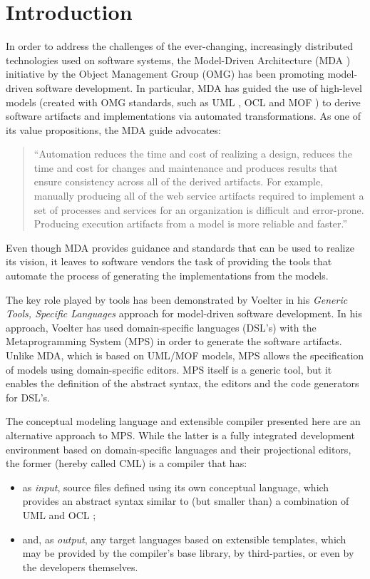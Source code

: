 \section{Introduction}
%
In order to address the challenges of the ever-changing, increasingly distributed technologies used on software systems, the Model-Driven Architecture (MDA \cite{mda}) initiative by the Object Management Group (OMG) has been promoting model-driven software development.
In particular, MDA has guided the use of high-level models (created with OMG standards, such as UML \cite{uml}, OCL \cite{ocl} and MOF \cite{mof}) to derive software artifacts and implementations via automated transformations.
As one of its value propositions, the MDA guide \cite{mda} advocates:
\begin{quote}``Automation reduces the time and cost of realizing a design, reduces the time and cost for changes and maintenance and produces results that ensure consistency across all of the derived artifacts. For example, manually producing all of the web service artifacts required to implement a set of processes and services for an organization is difficult and error-prone. Producing execution artifacts from a model is more reliable and faster.''\end{quote} 

Even though MDA provides guidance and standards that can be used to realize its vision, it leaves to software vendors the task of providing the tools that automate the process of generating the implementations from the models.

The key role played by tools has been demonstrated by Voelter \cite{voelter} in his \emph{Generic Tools, Specific Languages} approach for model-driven software development. In his approach, Voelter \cite{voelter} has used domain-specific languages (DSL's) with the Metaprogramming System (MPS) in order to generate the software artifacts.
Unlike MDA, which is based on UML/MOF models, MPS allows the specification of models using domain-specific editors.
MPS itself is a generic tool, but it enables the definition of the abstract syntax, the editors and the code generators for DSL's.

The conceptual modeling language and extensible compiler presented here are an alternative approach to MPS.
While the latter is a fully integrated development environment based on domain-specific languages and their projectional editors, the former (hereby called CML) is a compiler that has:
\begin{itemize}
\item as \emph{input}, source files defined using its own conceptual language, which provides an abstract syntax similar to (but smaller than) a combination of UML \cite{uml} and OCL \cite{ocl}; 
\item and, as \emph{output}, any target languages based on extensible templates, which may be provided by the compiler's base library, by third-parties, or even by the developers themselves.
\end{itemize}
